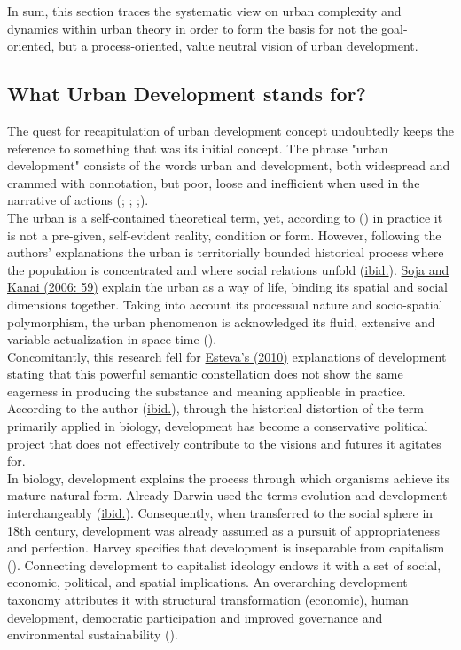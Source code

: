 \documentclass[11pt]{report}
\begin{document}
In sum, this section traces the systematic view on urban complexity and dynamics within urban theory in order to form the basis for not the goal-oriented, but a process-oriented, value neutral vision of urban development.

\subsection{What Urban Development stands for?}

The quest for recapitulation of urban development concept undoubtedly keeps the reference to something that was its initial concept.
The phrase "urban development" consists of the words urban and development, both widespread and crammed with connotation, but poor, loose and inefficient when used in the narrative of actions (\href{}{\cite{Bolay2006}}; \href{}{\cite{BolayAndKern ppt french}}; \href{}{\cite{Bolay what sustainable development 2012}};\href{}{\cite{BolayAndKern2012}}).
\\

The urban is a self-contained theoretical term, yet, according to (\href{Brenner}{\cite{BrennerAndSchmidt2013}}) in practice it is not a pre-given, self-evident reality, condition or form. 
However, following the authors' explanations the urban is territorially bounded historical process where the population is concentrated and where social relations unfold (\href{Brenner}{ibid.}).
\href{Soja}{Soja and Kanai (2006: 59)} explain the urban as a way of life, binding its spatial and social dimensions together.
Taking into account its processual nature and socio-spatial polymorphism, the urban phenomenon is acknowledged its fluid, extensive and variable actualization in space-time (\href{Brenner}{\cite{BrennerAndSchmidt2013}}).
\\

Concomitantly, this research fell for \href{Esteva}{Esteva's (2010)} explanations of development stating that this powerful semantic constellation does not show the same eagerness in producing the substance and meaning applicable in practice.
According to the author (\href{Esteva}{ibid.}), through the historical distortion of the term primarily applied in biology, development has become a conservative political project that does not effectively contribute to the visions and futures it agitates for. 
\\

In biology, development explains the process through which organisms achieve its mature natural form.
Already Darwin used the terms evolution and development interchangeably (\href{Esteva}{ibid.}).
Consequently, when transferred to the social sphere in 18th century, development was already assumed as a pursuit of appropriateness and perfection.
Harvey specifies that development is inseparable from capitalism (\href{Harvey}{\cite{Harvey1978}}).
Connecting development to capitalist ideology endows it with a set of social, economic, political, and spatial implications.
An overarching development taxonomy attributes it with structural transformation (economic), human development, democratic participation and improved governance and environmental sustainability (\href{Vázquez}{\cite{VázquezAndSumner2013}}).
\\
\end{document}
